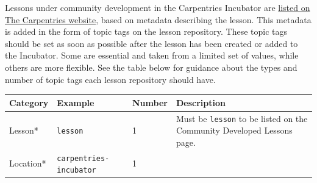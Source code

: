 \documentclass[
]{book}
\begin{document}
Lessons under community development in the Carpentries Incubator are
\href{https://carpentries.org/community-lessons/}{listed on The Carpentries website},
based on metadata describing the lesson.
This metadata is added in the form of topic tags on the lesson repository.
These topic tags should be set as soon as possible after the lesson has been
created or added to the Incubator.
Some are essential and taken from a limited set of values,
while others are more flexible.
See the table below for guidance about the types and number of topic tags each
lesson repository should have.

\begin{longtable}[]{@{}llll@{}}
\toprule
\begin{minipage}[b]{0.22\columnwidth}\raggedright
Category\strut
\end{minipage} & \begin{minipage}[b]{0.20\columnwidth}\raggedright
Example\strut
\end{minipage} & \begin{minipage}[b]{0.18\columnwidth}\raggedright
Number\strut
\end{minipage} & \begin{minipage}[b]{0.29\columnwidth}\raggedright
Description\strut
\end{minipage}\tabularnewline
\midrule
\endhead
\begin{minipage}[t]{0.22\columnwidth}\raggedright
Lesson*\strut
\end{minipage} & \begin{minipage}[t]{0.20\columnwidth}\raggedright
\texttt{lesson}\strut
\end{minipage} & \begin{minipage}[t]{0.18\columnwidth}\raggedright
1\strut
\end{minipage} & \begin{minipage}[t]{0.29\columnwidth}\raggedright
Must be \texttt{lesson} to be listed on the Community Developed Lessons page.\strut
\end{minipage}\tabularnewline
\begin{minipage}[t]{0.22\columnwidth}\raggedright
Location*\strut
\end{minipage} & \begin{minipage}[t]{0.20\columnwidth}\raggedright
\texttt{carpentries-incubator}\strut
\end{minipage} & \begin{minipage}[t]{0.18\columnwidth}\raggedright
1\strut
\end{minipage} & \begin{minipage}[t]{0.29\columnwidth}\raggedright

\end{minipage}
\end{longtable}
\end{document}
